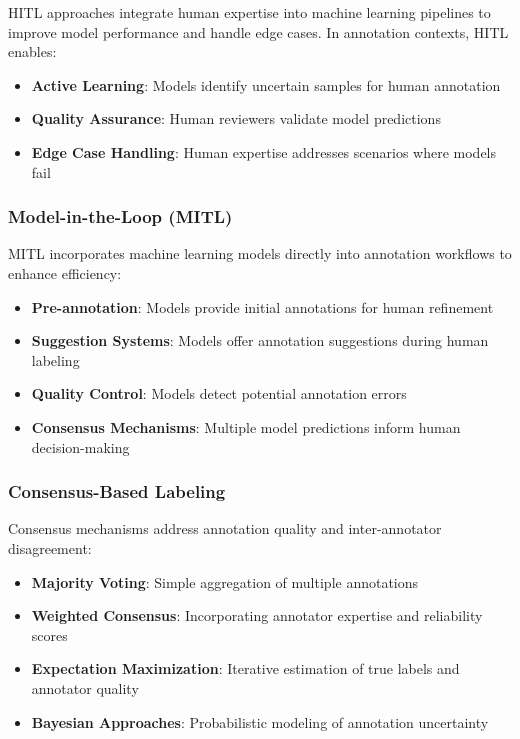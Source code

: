 HITL approaches \cite{wu2022human} integrate human expertise into machine learning pipelines to improve model performance and handle edge cases. In annotation contexts, HITL enables:

\begin{itemize}
    \item \textbf{Active Learning}: Models identify uncertain samples for human annotation
    \item \textbf{Quality Assurance}: Human reviewers validate model predictions
    \item \textbf{Edge Case Handling}: Human expertise addresses scenarios where models fail
\end{itemize}

\subsubsection{Model-in-the-Loop (MITL)}

MITL \cite{monarch2021human} incorporates machine learning models directly into annotation workflows to enhance efficiency:

\begin{itemize}
    \item \textbf{Pre-annotation}: Models provide initial annotations for human refinement
    \item \textbf{Suggestion Systems}: Models offer annotation suggestions during human labeling
    \item \textbf{Quality Control}: Models detect potential annotation errors
    \item \textbf{Consensus Mechanisms}: Multiple model predictions inform human decision-making
\end{itemize}

\subsubsection{Consensus-Based Labeling}

Consensus mechanisms \cite{sheng2008get} address annotation quality and inter-annotator disagreement:

\begin{itemize}
    \item \textbf{Majority Voting}: Simple aggregation of multiple annotations
    \item \textbf{Weighted Consensus}: Incorporating annotator expertise and reliability scores
    \item \textbf{Expectation Maximization}: Iterative estimation of true labels and annotator quality
    \item \textbf{Bayesian Approaches}: Probabilistic modeling of annotation uncertainty
\end{itemize}

